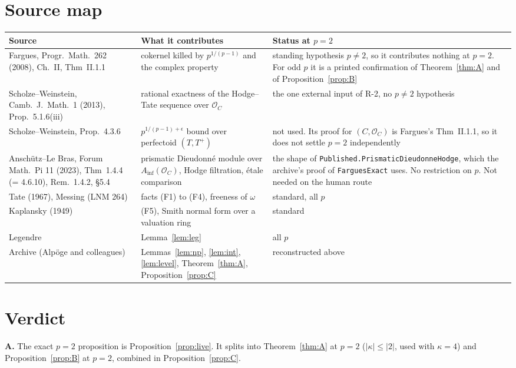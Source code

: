 \documentclass[11pt]{article}
\newcommand{\lean}[1]{\nolinkurl{#1}}
\theoremstyle{definition}
\theoremstyle{remark}
\newcommand{\cO}{\mathcal O}
\begin{document}
\section{Source map}

{\small\begin{longtable}{L{3.6cm}L{5.4cm}L{5.8cm}}
\toprule
Source & What it contributes & Status at $p=2$\\
\midrule
Fargues, Progr.\ Math.\ 262 (2008), Ch.~II, Thm~II.1.1 & cokernel killed by $p^{1/(p-1)}$ and the complex property & standing hypothesis $p\ne2$, so it contributes nothing at $p=2$. For odd $p$ it is a printed confirmation of Theorem~\ref{thm:A} and of Proposition~\ref{prop:B}\\
Scholze--Weinstein, Camb.\ J.\ Math.\ 1 (2013), Prop.~5.1.6(iii) & rational exactness of the Hodge--Tate sequence over $\cO_C$ & the one external input of R-2, no $p\ne2$ hypothesis\\
Scholze--Weinstein, Prop.~4.3.6 & $p^{1/(p-1)+\epsilon}$ bound over perfectoid $(T,T^+)$ & not used. Its proof for $(C,\cO_C)$ is Fargues's Thm~II.1.1, so it does not settle $p=2$ independently\\
Anschütz--Le Bras, Forum Math.\ Pi 11 (2023), Thm~1.4.4 (= 4.6.10), Rem.~1.4.2, §5.4 & prismatic Dieudonné module over $A_{\inf}(\cO_C)$, Hodge filtration, étale comparison & the shape of \lean{Published.PrismaticDieudonneHodge}, which the archive's proof of \lean{FarguesExact} uses. No restriction on $p$. Not needed on the human route\\
Tate (1967), Messing (LNM 264) & facts (F1) to (F4), freeness of $\omega$ & standard, all $p$\\
Kaplansky (1949) & (F5), Smith normal form over a valuation ring & standard\\
Legendre & Lemma~\ref{lem:leg} & all $p$\\
Archive (Alpöge and colleagues) & Lemmas~\ref{lem:np}, \ref{lem:int}, \ref{lem:level}, Theorem~\ref{thm:A}, Proposition~\ref{prop:C} & reconstructed above\\
\bottomrule
\end{longtable}}

\section{Verdict}

\textbf{A.} The exact $p=2$ proposition is Proposition~\ref{prop:live}. It splits into Theorem~\ref{thm:A} at $p=2$ ($\lvert\kappa\rvert\le\lvert2\rvert$, used with $\kappa=4$) and Proposition~\ref{prop:B} at $p=2$, combined in Proposition~\ref{prop:C}.
\end{document}
